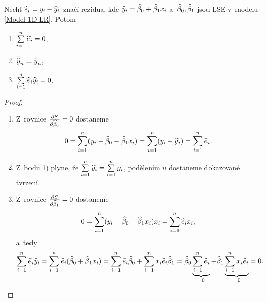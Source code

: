 \begin{lemma}\label{lemma_k_vete}
	Nechť $\widehat{e}_i = y_i-\hyi$ značí rezidua, kde $\hyi = \wbeta_0+\wbeta_1 x_i$ a~$\wbeta_0,\wbeta_1$ jsou LSE v~modelu \eqref{Model 1D LR}. Potom \begin{enumerate}
		\item $\sumin \widehat{e}_i = 0$,
		\item $\lhyn = \lyn$,
		\item $\sumin \widehat{e}_i\hyi = 0$.
	\end{enumerate}
\begin{proof}
	\begin{enumerate}
		\item Z~rovnice $\frac{\partial S}{\partial\wbeta_0} = 0$ dostaneme $$ 0 = \sumin (y_i-\wbeta_0-\wbeta_1 x_i) = \sumin (y_i-\hyi) = \sumin \widehat{e}_i. $$
		\item Z~bodu 1) plyne, že $\sumin \hyi = \sumin y_i$, podělením $n$ dostaneme dokazované tvrzení.
		\item Z~rovnice $\frac{\partial S}{\partial\wbeta_1} = 0$ dostaneme $$ 0 = \sumin (y_i-\wbeta_0-\wbeta_1 x_i)x_i = \sumin \hei x_i, $$ a~tedy $$ \sumin \hei\hyi = \sumin \hei (\wbeta_0+\wbeta_1 x_i) = \sumin \hei\wbeta_0+\sumin x_i \hei\wbeta_1 = \wbeta_0\underbrace{\sumin \hei}_{ = 0}+\wbeta_1\underbrace{\sumin x_i\hei}_{ = 0} = 0. $$
	\end{enumerate}
\end{proof}
\end{lemma}
